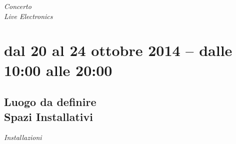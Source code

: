 \documentclass[8pt, twoside, a5paper]{extreport}
\begin{document}
\begin{Parallel}[c]{0.47\textwidth}{0.47\textwidth}
{\fontsize{40}{40}\selectfont \textit{Concerto\\ Live Electronics}}
\bigskip


\section*{}
	
	


	\ParallelPar
	\clearpage


\section*{dal 20 al 24 ottobre 2014 -- dalle 10:00 alle 20:00}
\subsection*{\textsf{Luogo da definire\\
	{\small Spazi Installativi\\}}}

{\fontsize{40}{40}\selectfont \textit{Installazioni}}
\bigskip


\end{Parallel}
\end{document}
